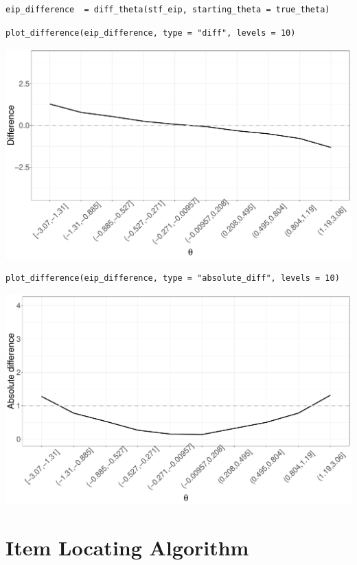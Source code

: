 \documentclass[aspectratio=149, compress]{beamer}
\begin{document}
\begin{frame}[fragile]

\begin{verbatim}
eip_difference  = diff_theta(stf_eip, starting_theta = true_theta)
\end{verbatim}

\begin{overprint}
\small
\begin{verbatim}
plot_difference(eip_difference, type = "diff", levels = 10) 
\end{verbatim}

\centering

\includegraphics[width=.8\linewidth]{img/difference}


\small
\begin{verbatim}
plot_difference(eip_difference, type = "absolute_diff", levels = 10) 
\end{verbatim}

\centering

\includegraphics[width=.8\linewidth]{img/absolute-difference}
\end{overprint}


\end{frame}


\section[ILA]{Item Locating Algorithm}
\end{document}
